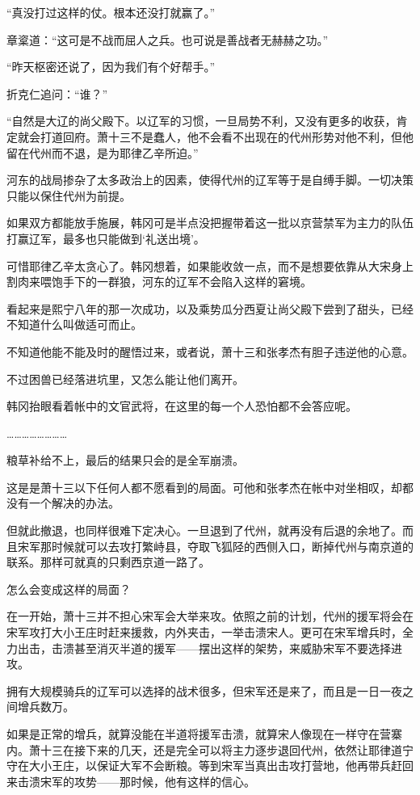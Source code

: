 “真没打过这样的仗。根本还没打就赢了。”

章楶道：“这可是不战而屈人之兵。也可说是善战者无赫赫之功。”

“昨天枢密还说了，因为我们有个好帮手。”

折克仁追问：“谁？”

“自然是大辽的尚父殿下。以辽军的习惯，一旦局势不利，又没有更多的收获，肯定就会打道回府。萧十三不是蠢人，他不会看不出现在的代州形势对他不利，但他留在代州而不退，是为耶律乙辛所迫。”

河东的战局掺杂了太多政治上的因素，使得代州的辽军等于是自缚手脚。一切决策只能以保住代州为前提。

如果双方都能放手施展，韩冈可是半点没把握带着这一批以京营禁军为主力的队伍打赢辽军，最多也只能做到‘礼送出境’。

可惜耶律乙辛太贪心了。韩冈想着，如果能收敛一点，而不是想要依靠从大宋身上割肉来喂饱手下的一群狼，河东的辽军不会陷入这样的窘境。

看起来是熙宁八年的那一次成功，以及乘势瓜分西夏让尚父殿下尝到了甜头，已经不知道什么叫做适可而止。

不知道他能不能及时的醒悟过来，或者说，萧十三和张孝杰有胆子违逆他的心意。

不过困兽已经落进坑里，又怎么能让他们离开。

韩冈抬眼看着帐中的文官武将，在这里的每一个人恐怕都不会答应呢。

……………………

粮草补给不上，最后的结果只会的是全军崩溃。

这是是萧十三以下任何人都不愿看到的局面。可他和张孝杰在帐中对坐相叹，却都没有一个解决的办法。

但就此撤退，也同样很难下定决心。一旦退到了代州，就再没有后退的余地了。而且宋军那时候就可以去攻打繁峙县，夺取飞狐陉的西侧入口，断掉代州与南京道的联系。那样可就真的只剩西京道一路了。

怎么会变成这样的局面？

在一开始，萧十三并不担心宋军会大举来攻。依照之前的计划，代州的援军将会在宋军攻打大小王庄时赶来援救，内外夹击，一举击溃宋人。更可在宋军增兵时，全力出击，击溃甚至消灭半道的援军——摆出这样的架势，来威胁宋军不要选择进攻。

拥有大规模骑兵的辽军可以选择的战术很多，但宋军还是来了，而且是一日一夜之间增兵数万。

如果是正常的增兵，就算没能在半道将援军击溃，就算宋人像现在一样守在营寨内。萧十三在接下来的几天，还是完全可以将主力逐步退回代州，依然让耶律道宁守在大小王庄，以保证大军不会断粮。等到宋军当真出击攻打营地，他再带兵赶回来击溃宋军的攻势——那时候，他有这样的信心。

